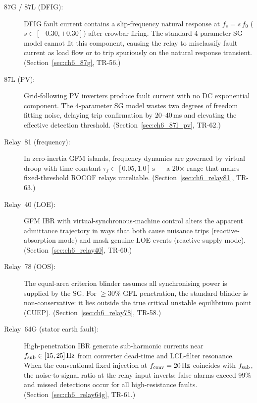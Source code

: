 \begin{description}
  \item[87G / 87L (DFIG):] DFIG fault current contains a slip-frequency natural
    response at $f_s = s\,f_0$ ($s \in [-0.30, +0.30]$) after crowbar firing.
    The standard 4-parameter SG model cannot fit this component, causing the
    relay to misclassify fault current as load flow or to trip spuriously on the
    natural response transient.
    (Section~\ref{sec:ch6_87g}, TR-56.)

  \item[87L (PV):] Grid-following PV inverters produce fault current with no DC
    exponential component.  The 4-parameter SG model wastes two degrees of
    freedom fitting noise, delaying trip confirmation by 20--40\,ms and elevating
    the effective detection threshold.
    (Section~\ref{sec:ch6_87l_pv}, TR-62.)

  \item[Relay~81 (frequency):] In zero-inertia GFM islands, frequency dynamics
    are governed by virtual droop with time constant $\tau_f \in [0.05, 1.0]\,\text{s}$
    — a 20$\times$ range that makes fixed-threshold ROCOF relays unreliable.
    (Section~\ref{sec:ch6_relay81}, TR-63.)

  \item[Relay~40 (LOE):] GFM IBR with virtual-synchronous-machine control alters
    the apparent admittance trajectory in ways that both cause nuisance trips
    (reactive-absorption mode) and mask genuine LOE events (reactive-supply mode).
    (Section~\ref{sec:ch6_relay40}, TR-60.)

  \item[Relay~78 (OOS):] The equal-area criterion blinder assumes all
    synchronising power is supplied by the SG.  For $\geq 30\%$ GFL penetration,
    the standard blinder is non-conservative: it lies outside the true critical
    unstable equilibrium point (CUEP).
    (Section~\ref{sec:ch6_relay78}, TR-58.)

  \item[Relay~64G (stator earth fault):] High-penetration IBR generate
    sub-harmonic currents near $f_{\rm sub} \in [15, 25]\,\text{Hz}$ from
    converter dead-time and LCL-filter resonance.  When the conventional fixed
    injection at $f_{\rm conv} = 20\,\text{Hz}$ coincides with $f_{\rm sub}$,
    the noise-to-signal ratio at the relay input inverts: false alarms exceed
    99\% and missed detections occur for all high-resistance faults.
    (Section~\ref{sec:ch6_relay64g}, TR-61.)
\end{description}

